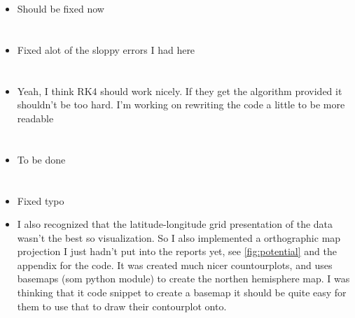\documentclass[x11names]{article}
\begin{document}
  \section{}
    \begin{itemize}
      \item Should be fixed now
    \end{itemize}

  \section{}
    \begin{itemize}
      \item Fixed alot of the sloppy errors I had here
    \end{itemize}

  \section{}
    \begin{itemize}
      \item Yeah, I think RK4 should work nicely. If they get the algorithm provided it shouldn't be too hard. I'm working on rewriting the code a little to be more readable
    \end{itemize}

  \section{}
    \begin{itemize}
      \item To be done
    \end{itemize}

  \section{}
    \begin{itemize}
      \item Fixed typo
      \item I also recognized that the latitude-longitude grid presentation of the data wasn't the best so visualization. So I also implemented a orthographic map projection I just hadn't put into the reports yet, see \cref{fig:potential} and the appendix for the code. It was created much nicer countourplots, and uses basemaps (som python module) to create the northen hemisphere map. I was thinking that it code snippet to create a basemap it should be quite easy for them to use that to draw their contourplot onto.
    \end{itemize}
\end{document}
